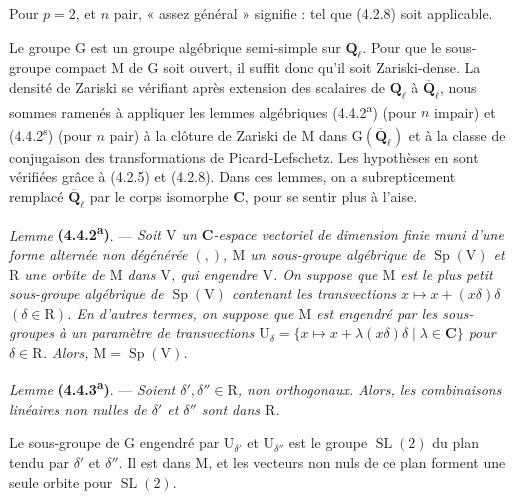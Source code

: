 \documentclass[11pt,leqno]{article}
\begin{document}
Pour \(p=2\), et \(n\) pair, « assez général » signifie : tel que (4.2.8) soit applicable.

Le groupe \(\mathrm{G}\) est un groupe algébrique semi-simple sur \(\mathbf{Q}_\ell\). Pour que le sous-groupe compact \(\mathrm{M}\) de \(\mathrm{G}\) soit ouvert, il suffit donc qu’il soit Zariski-dense. La densité de Zariski se vérifiant après extension des scalaires de \(\mathbf{Q}_\ell\) à \(\overline{\mathbf{Q}}_\ell\), nous sommes ramenés à appliquer les lemmes algébriques (4.4.2\textsuperscript{a}) (pour \(n\) impair) et (4.4.2\textsuperscript{s}) (pour \(n\) pair) à la clôture de Zariski de \(\mathrm{M}\) dans \(\mathrm{G}(\overline{\mathbf{Q}}_\ell)\) et à la classe de conjugaison des transformations de Picard-Lefschetz. Les hypothèses en sont vérifiées grâce à (4.2.5) et (4.2.8). Dans ces lemmes, on a subrepticement remplacé \(\overline{\mathbf{Q}}_\ell\) par le corps isomorphe \(\mathbf{C}\), pour se sentir plus à l’aise.

\textit{Lemme} \textbf{(4.4.2\textsuperscript{a})}. — \textit{Soit \(\mathrm{V}\) un \(\mathbf{C}\)-espace vectoriel de dimension finie muni d’une forme alternée non dégénérée \((,)\), \(\mathrm{M}\) un sous-groupe algébrique de \(\operatorname{Sp}(\mathrm{V})\) et \(\mathrm{R}\) une orbite de \(\mathrm{M}\) dans \(\mathrm{V}\), qui engendre \(\mathrm{V}\). On suppose que \(\mathrm{M}\) est le plus petit sous-groupe algébrique de \(\operatorname{Sp}(\mathrm{V})\) contenant les transvections \(x\mapsto x+(x\delta)\delta\) \((\delta\in\mathrm{R})\). En d’autres termes, on suppose que \(\mathrm{M}\) est engendré par les sous-groupes à un paramètre de transvections \(\mathrm{U}_\delta=\{x\mapsto x+\lambda(x\delta)\delta\mid\lambda\in\mathbf{C}\}\) pour \(\delta\in\mathrm{R}\). Alors, \(\mathrm{M}=\operatorname{Sp}(\mathrm{V})\).}

\textit{Lemme} \textbf{(4.4.3\textsuperscript{a})}. — \textit{Soient \(\delta',\delta''\in\mathrm{R}\), non orthogonaux. Alors, les combinaisons linéaires non nulles de \(\delta'\) et \(\delta''\) sont dans \(\mathrm{R}\).}

Le sous-groupe de \(\mathrm{G}\) engendré par \(\mathrm{U}_{\delta'}\) et \(\mathrm{U}_{\delta''}\) est le groupe \(\operatorname{SL}(2)\) du plan tendu par \(\delta'\) et \(\delta''\). Il est dans \(\mathrm{M}\), et les vecteurs non nuls de ce plan forment une seule orbite pour \(\operatorname{SL}(2)\).
\end{document}
